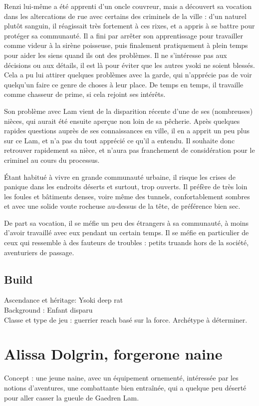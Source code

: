\documentclass[10pt,a4paper]{book}
\begin{document}
Renzi lui-même a été apprenti d'un oncle couvreur, mais a découvert sa vocation dans les altercations de rue avec certains des criminels de la ville : d'un naturel plutôt sanguin, il réagissait très fortement à ces rixes, et a appris à se battre pour protéger sa communauté. Il a fini par arrêter son apprentissage pour travailler comme videur à la sirène poisseuse, puis finalement pratiquement à plein temps pour aider les siens quand ils ont des problèmes. Il ne s'intéresse pas aux décisions ou aux détails, il est là pour éviter que les autres ysoki ne soient blessés. Cela a pu lui attirer quelques problèmes avec la garde, qui n'apprécie pas de voir quelqu'un faire ce genre de choses à leur place. De temps en temps, il travaille comme chasseur de prime, si cela rejoint ses intérêts.

Son problème avec Lam vient de la disparition récente d'une de ses (nombreuses) nièces, qui aurait été ensuite aperçue non loin de sa pêcherie. Après quelques rapides questions auprès de ses connaissances en ville, il en a apprit un peu plus sur ce Lam, et n'a pas du tout apprécié ce qu'il a entendu. Il souhaite donc retrouver rapidement sa nièce, et n'aura pas franchement de considération pour le criminel au cours du processus.

Étant habitué à vivre en grande communauté urbaine, il risque les crises de panique dans les endroits déserts et surtout, trop ouverts. Il préfère de très loin les foules et bâtiments denses, voire même des tunnels, confortablement sombres et avec une solide voute rocheuse au-dessus de la tête, de préférence bien sec.

De part sa vocation, il se méfie un peu des étrangers à sa communauté, à moins d'avoir travaillé avec eux pendant un certain temps. Il se méfie en particulier de ceux qui ressemble à des fauteurs de troubles : petits truands hors de la société, aventuriers de passage.
\subsection{Build}
Ascendance et héritage: Ysoki deep rat\\
Background : Enfant disparu\\
Classe et type de jeu : guerrier reach basé sur la force. Archétype à déterminer.\\


\section{Alissa Dolgrin, forgerone naine}
Concept : une jeune naine, avec un équipement ornementé, intéressée par les notions d'aventures, une combattante bien entraînée, qui a quelque peu déserté pour aller casser la gueule de Gaedren Lam.
\end{document}
